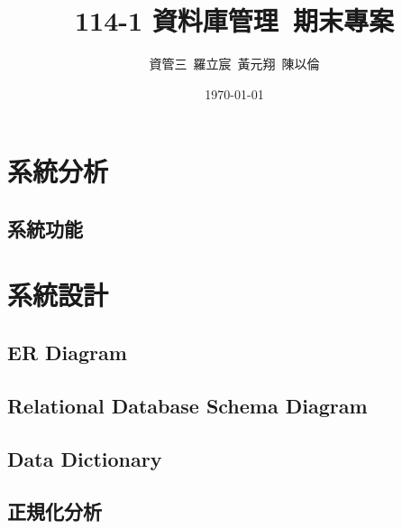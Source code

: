 \documentclass[a4paper]{article}
\title{114-1 資料庫管理\ 期末專案}
\author{資管三~羅立宸~黃元翔~陳以倫}
\date{\today} %
\begin{document}
\maketitle %

\section{系統分析} %
\subsection{系統功能}


\section{系統設計}
\subsection{ER Diagram}
\subsection{Relational Database Schema Diagram}
\subsection{Data Dictionary}
\subsection{正規化分析}
\end{document}

